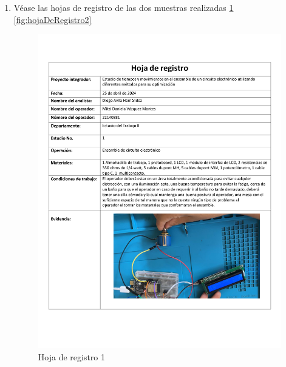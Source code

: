     \begin{enumerate}
    \item Véase las hojas de registro de las dos muestras realizadas \ref{fig:hojaDeRegistro1} \ref{fig:hojaDeRegistro2}
    \begin{figure}[H]
        \centering
        \includegraphics[scale=0.4]{3/Img/hojaDeRegistro1.pdf}
        \caption{Hoja de registro 1} 
        \label{fig:hojaDeRegistro1}
    \end{figure}
    \begin{figure}[H]
        \centering

\end{figure}
\end{enumerate}
